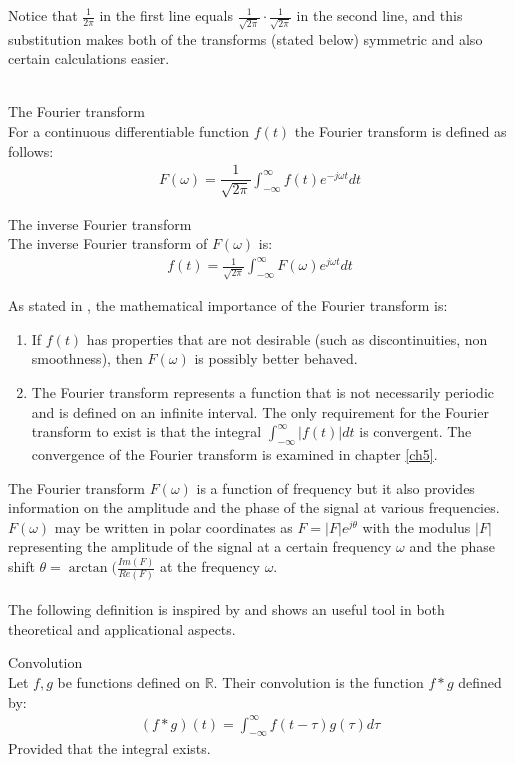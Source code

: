 \noindent
Notice that $\frac{1}{2\pi}$ in the first line equals $\frac{1}{\sqrt{2\pi}} \cdot \frac{1}{\sqrt{2\pi}}$ in the second line, and this substitution makes both of the transforms (stated below) symmetric and also certain calculations easier. \cite{Page 10, FourierTrans}
\\ \\
\begin{definition}{The Fourier transform} \label{def:Fourier_trans}
\\
For a continuous differentiable function $f(t)$ the Fourier transform is defined as follows:
\begin{align*}
F(\omega) = \dfrac{1}{\sqrt{2\pi}} \int_{-\infty}^\infty f(t) e^{-j \omega t} dt
\end{align*}
\end{definition}

\begin{definition}{The inverse Fourier transform} \label{def:InverseFourier_trans}
\\
The inverse Fourier transform of $F(\omega)$ is:
\begin{align*}
f(t) = \frac{1}{\sqrt{2\pi}} \int_{-\infty}^\infty F(\omega) e^{j \omega t} dt
\end{align*}
\end{definition}

\noindent
As stated in \cite{FourierTrans}, the mathematical importance of the Fourier transform is:
\begin{enumerate}
\item If $f(t)$ has properties that are not desirable (such as discontinuities, non smoothness), then $F(\omega)$ is possibly better behaved.
\item The Fourier transform represents a function that is not necessarily periodic and is defined on an infinite interval. The only requirement for the Fourier transform to exist is that the integral $\int_{-\infty}^\infty |f(t)| dt$ is convergent. The convergence of the Fourier transform is examined in chapter \ref{ch5}.
\end{enumerate}

\noindent
The Fourier transform $F(\omega)$ is a function of frequency but it also provides information on the amplitude and the phase of the signal at various frequencies. $F(\omega)$ may be written in polar coordinates as $F = |F|e^{j\theta}$ with the modulus $|F|$ representing the amplitude of the signal at a certain frequency $\omega$ and the phase shift $\theta = \arctan(\frac{Im(F)}{Re(F)}$ at the frequency $\omega$.
\\ \\
The following definition is inspired by \cite{page 206, FAA} and shows an useful tool in both theoretical and applicational aspects.
\begin{definition}{Convolution} \label{def:Convol}
\\
Let $f,g$ be functions defined on $\mathbb{R}$. Their convolution is the function $f*g$ defined by:
\begin{align*}
(f*g)(t) = \int_{-\infty}^\infty f(t-\tau) g(\tau) d\tau
\end{align*}
Provided that the integral exists.
\end{definition}

